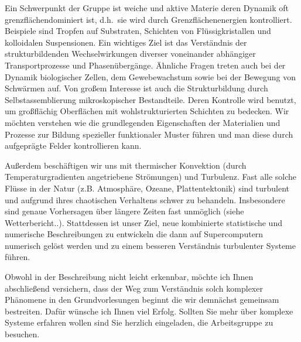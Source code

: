 \documentclass[twocolumn,a4paper,10pt]{article}
\begin{document}
Ein Schwerpunkt der Gruppe ist weiche und aktive Materie deren Dynamik oft grenzfl\"achendominiert ist, d.h.\ sie wird durch Grenzfl\"achenenergien kontrolliert. Beispiele sind Tropfen auf Substraten, Schichten von Fl\"ussig\-kristallen und kolloidalen Suspensionen. Ein wichtiges Ziel ist das Verst\"andnis der strukturbildenden Wechselwirkungen diverser voneinander abh\"angiger  Transportprozesse und Phasen\"uberg\"ange. \"Ahnliche Fragen treten auch bei der Dynamik biologischer Zellen, dem Gewebe\-wachstum sowie bei der Bewegung von Schw\"armen auf. Von gro{\ss}em Interesse ist auch die Strukturbildung durch Selbstassemblierung mikroskopischer Bestandteile. Deren Kontrolle wird benutzt,  um gro{\ss}fl\"achig Oberfl\"achen mit wohlstrukturierten Schichten zu bedecken. Wir m\"ochten verstehen wie die grundlegenden Eigenschaften der Materialien und Prozesse zur Bildung spezieller funktionaler Muster f\"uhren und man diese durch aufgepr\"agte Felder kontrollieren kann.

Au\ss{}erdem besch\"aftigen wir uns mit thermi\-scher Konvektion (durch Temperaturgradienten angetriebene Str\"omungen) und Turbulenz. Fast alle solche Fl\"usse in der Natur (z.B. Atmosph\"are, Ozeane, Plattentektonik) sind turbulent und aufgrund ihres chaotischen Verhaltens schwer zu behandeln. Insbesondere sind genaue Vorhersagen \"uber l\"angere Zeiten fast unm\"oglich (siehe Wetterbericht..). Stattdessen ist unser Ziel, neue kombinierte statistische und numerische Beschreibungen zu entwickeln die dann auf Supercomputern numerisch gel\"ost werden und zu einem besseren Verst\"andnis turbulenter Systeme f\"uhren. 

Obwohl in der Beschreibung nicht leicht erkennbar, m\"ochte ich Ihnen abschlie{\ss}end versichern, dass der
Weg zum Verst\"andnis solch komplexer Ph\"anomene in den Grundvorlesungen beginnt die wir demn\"achst gemeinsam
bestreiten. Daf\"ur w\"unsche ich Ihnen viel Erfolg. Sollten Sie mehr \"uber komplexe Systeme erfahren wollen sind Sie herzlich eingeladen, die Arbeitsgruppe zu besuchen.
\end{document}
